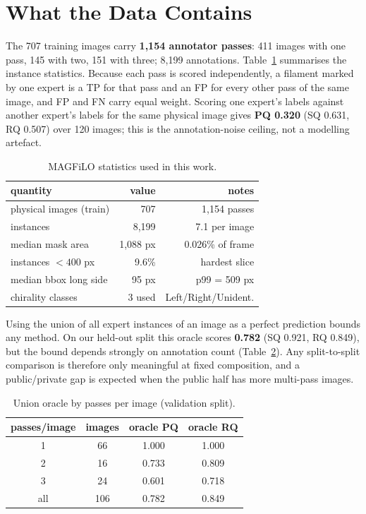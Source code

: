 \documentclass[conference]{IEEEtran}
\begin{document}
\section{What the Data Contains}
The 707 training images carry \textbf{1{,}154 annotator passes}: 411 images with one pass, 145 with two, 151 with three; 8{,}199 annotations. Table~\ref{tab:data} summarises the instance statistics. Because each pass is scored independently, a filament marked by one expert is a TP for that pass and an FP for every other pass of the same image, and FP and FN carry equal weight. Scoring one expert's labels against another expert's labels for the same physical image gives \textbf{PQ 0.320} (SQ 0.631, RQ 0.507) over 120 images; this is the annotation-noise ceiling, not a modelling artefact.
\begin{table}[t]
\centering
\caption{MAGFiLO statistics used in this work.}
\label{tab:data}
\begin{tabular}{lrr}
\toprule
quantity & value & notes\\
\midrule
physical images (train) & 707 & 1{,}154 passes\\
instances & 8{,}199 & 7.1 per image\\
median mask area & 1{,}088 px & 0.026\% of frame\\
instances $<400$ px & 9.6\% & hardest slice\\
median bbox long side & 95 px & p99 = 509 px\\
chirality classes & 3 used & Left/Right/Unident.\\
\bottomrule
\end{tabular}
\end{table}
Using the union of all expert instances of an image as a perfect prediction bounds any method. On our held-out split this oracle scores \textbf{0.782} (SQ 0.921, RQ 0.849), but the bound depends strongly on annotation count (Table~\ref{tab:oracle}). Any split-to-split comparison is therefore only meaningful at fixed composition, and a public/private gap is expected when the public half has more multi-pass images.
\begin{table}[t]
\centering
\caption{Union oracle by passes per image (validation split).}
\label{tab:oracle}
\begin{tabular}{cccc}
\toprule
passes/image & images & oracle PQ & oracle RQ\\
\midrule
1 & 66 & 1.000 & 1.000\\
2 & 16 & 0.733 & 0.809\\
3 & 24 & 0.601 & 0.718\\
\midrule
all & 106 & 0.782 & 0.849\\
\bottomrule
\end{tabular}
\end{table}
\end{document}
